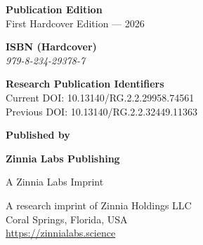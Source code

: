 \vspace{0.2in}


\noindent
\textbf{Publication Edition}\\
First Hardcover Edition --- 2026

\vspace{0.2in}


\noindent
\textbf{ISBN (Hardcover)}\\
\textit{979-8-234-29378-7}

\vspace{0.2in}


\noindent
\textbf{Research Publication Identifiers}\\
Current DOI: 10.13140/RG.2.2.29958.74561\\
Previous DOI: 10.13140/RG.2.2.32449.11363

\vspace{0.2in}


\noindent
\textbf{Published by}

\vspace{0.08in}

\noindent
{\large\bfseries Zinnia Labs Publishing}

\vspace{0.04in}

\noindent
{\small A Zinnia Labs Imprint}

\vspace{0.12in}

\noindent
A research imprint of Zinnia Holdings LLC\\
Coral Springs, Florida, USA\\
\url{https://zinnialabs.science}

\clearpage



\thispagestyle{empty}

